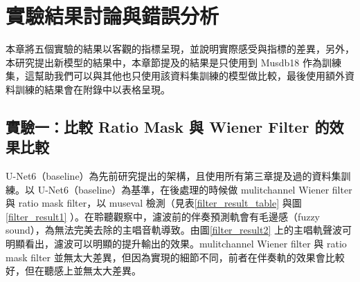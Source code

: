 \chapter{實驗結果討論與錯誤分析}

本章將五個實驗的結果以客觀的指標呈現，並說明實際感受與指標的差異，另外，本研究提出新模型的結果中，本章節提及的結果是只使用到 Musdb18 作為訓練集，這幫助我們可以與其他也只使用該資料集訓練的模型做比較，最後使用額外資料訓練的結果會在附錄中以表格呈現。

\section{實驗一：比較 Ratio Mask 與 Wiener Filter 的效果比較}
U-Net6（baseline）為先前研究提出的架構，且使用所有第三章提及過的資料集訓練。以 U-Net6（baseline）為基準，在後處理的時候做 mulitchannel Wiener filter 與 ratio mask filter，以 museval 檢測（見表\ref{filter_result_table} 與圖\ref{filter_result1} ）。在聆聽觀察中，濾波前的伴奏預測軌會有毛邊感（fuzzy sound），為無法完美去除的主唱音軌導致。由圖\ref{filter_result2} 上的主唱軌聲波可明顯看出，濾波可以明顯的提升輸出的效果。mulitchannel Wiener filter 與 ratio mask filter 並無太大差異，但因為實現的細節不同，前者在伴奏軌的效果會比較好，但在聽感上並無太大差異。

\begin{table}[htbp]
\centering
{}
\caption{實驗數據表}
\label{filter_result_table}
\end{table}


